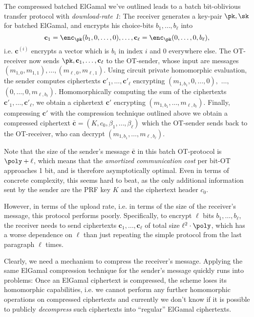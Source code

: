 The compressed batched ElGamal we've outlined leads to a batch bit-oblivious transfer protocol with \emph{download-rate 1}: The receiver generates a key-pair $\pk,\sk$ for batched ElGamal, and encrypts his choice-bits $b_1,\dots,b_\ell$ into
$$\mathbf{c}_1 = \enc_\pk(b_1,0,\dots,0),\dots,\mathbf{c}_\ell =\enc_\pk(0,\dots,0,b_\ell),$$
i.e. $\mathbf{c}^{(i)}$ encrypts a vector which is $b_i$ in index $i$ and $0$ everywhere else. The OT-receiver now sends $\pk,\mathbf{c}_1,\dots,\mathbf{c}_\ell$ to the OT-sender, whose input are messages $(m_{1,0},m_{1,1}),\dots,(m_{\ell,0},m_{\ell,1})$. Using circuit private homomorphic evaluation, the sender computes ciphertexts $\mathbf{c}'_1,\dots,\mathbf{c}'_\ell$ encrypting $(m_{1,b_1},0,\dots,0),$ $\dots,$ $(0,\dots,0,m_{\ell,b_\ell})$. Homomorphically computing the sum of the ciphertexts $\mathbf{c}'_1,\dots,\mathbf{c}'_\ell$, we obtain a ciphertext $\mathbf{c}'$ encrypting $(m_{1,b_1},\dots,m_{\ell,b_\ell})$. Finally, compressing $\mathbf{c}'$ with the compression technique outlined above we obtain a compressed ciphertext $\bar{\mathbf{c}} = (K,c_0,\beta_1,\dots,\beta_\ell)$ which the OT-sender sends back to the OT-receiver, who can decrypt $(m_{1,b_1},\dots,m_{\ell,b_\ell})$.

Note that the size of the sender's message $\bar{\mathbf{c}}$ in this batch OT-protocol is $\poly + \ell$, which means that the \emph{amortized communication cost} per bit-OT approaches 1 bit, and is therefore asymptotically optimal. Even in terms of concrete complexity, this seems hard to beat, as the only additional information sent by the sender are the PRF key $K$ and the ciphertext header $c_0$.

However, in terms of the upload rate, i.e. in terms of the size of the receiver's message, this protocol performs poorly. Specifically, to encrypt $\ell$ bits $b_1,\dots,b_\ell$, the receiver needs to send ciphertexts $\mathbf{c}_1,\dots,\mathbf{c}_\ell$ of total size $\ell^2 \cdot \poly$, which has a worse dependence on $\ell$ than just repeating the simple protocol from the last paragraph $\ell$ times.

Clearly, we need a mechanism to compress the receiver's message. Applying the same ElGamal compression technique for the sender's message quickly runs into problems: Once an ElGamal ciphertext is compressed, the scheme loses its homomorphic capabilities, i.e. we cannot perform any further homomorphic operations on compressed ciphertexts and currently we don't know if it is possible to publicly \emph{decompress} such ciphertexts into ``regular'' ElGamal ciphertexts. 

